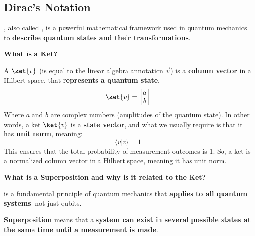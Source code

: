 \subsection{Dirac's Notation}

, also called , is a powerful mathematical framework used in quantum mechanics to \textbf{describe quantum states and their transformations}.

\highspace
\begin{flushleft}
    \textcolor{Green3}{ \textbf{What is a Ket?}}
\end{flushleft}
A  $\ket{v}$ (is equal to the linear algebra annotation $\overrightarrow{v}$) is a \textbf{column vector} in a Hilbert space, that \textbf{represents a quantum state}.
\begin{equation*}
    \ket{v} = \begin{bmatrix}
        a \\ b
    \end{bmatrix}
\end{equation*}
Where $a$ and $b$ are complex numbers (amplitudes of the quantum state). In other words, a ket $\ket{v}$ is a \textbf{state vector}, and what we usually require is that it has \textbf{unit norm}, meaning:
\begin{equation*}
    \langle v | v \rangle = 1
\end{equation*}
This ensures that the total probability of measurement outcomes is 1. So, a ket is a normalized column vector in a Hilbert space, meaning it has unit norm.

\highspace
\begin{flushleft}
    \textcolor{Green3}{ \textbf{What is a Superposition and why is it related to the Ket?}}
\end{flushleft}
 is a fundamental principle of quantum mechanics that \textbf{applies to all quantum systems}, not just qubits.
\begin{definitionbox}[: Superposition]
    \textbf{Superposition} means that a \textbf{system can exist in several possible states at the same time until a measurement is made}.
\end{definitionbox}

